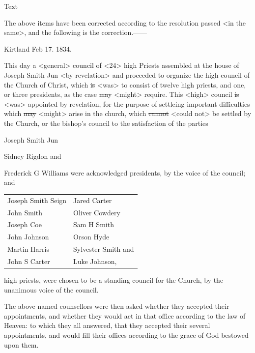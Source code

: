				\begin{description}
					\item[Text]
				\end{description}
				
					The above items have been corrected according to the resolution passed <in the same>, and the following is the correction.------

					\begin{tightright}
					Kirtland Feb 17. 1834.
					\end{tightright}

					This day a <general> council of <24> high Priests assembled at the house of Joseph Smith Jun <by revelation> and proceeded to organize the high council of the Church of Christ, which \sout{is} <was> to consist of twelve high priests, and one, or three presidents, as the case \sout{may} <might> require. This <high> council \sout{is} <was> appointed by revelation, for the purpose of settleing important difficulties which \sout{may} <might> arise in the church, which \sout{cannot} <could not> be settled by the Church, or the bishop's council to the satisfaction of the parties
					
					\begin{tightcenter}
					Joseph Smith Jun

					Sidney Rigdon and
					
					Frederick G Williams were acknowledged presidents, by the voice of the council; and
					\end{tightcenter}

					\begin{tabular}{p{3in}p{3in}}
					Joseph Smith Seign & Jared Carter \\
					John Smith & Oliver Cowdery \\
					Joseph Coe & Sam\supers{l.} H Smith \\
					John Johnson & Orson Hyde \\
					Martin Harris & Sylvester Smith and \\
					John S Carter & Luke Johnson, \\
					\end{tabular}

					high priests, were chosen to be a standing council for the Church, by the unanimous voice of the council.

					The above named counsellors were then asked whether they accepted their appointments, and whether they would act in that office according to the law of Heaven: to which they all answered, that they accepted their several appointments, and would fill their offices according to the grace of God bestowed upon them.


